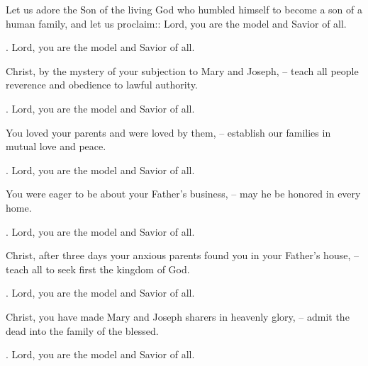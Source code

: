\lettrine[loversize=0.15,lines=2]{L}{}et us adore the Son of the living God who humbled himself to become a son of a human family, and let us proclaim::
Lord, you are the model and Savior of all.
\par \Rbar. Lord, you are the model and Savior of all.

Christ, by the mystery of your subjection to Mary and Joseph,
– teach all people reverence and obedience to lawful authority.
\par \Rbar. Lord, you are the model and Savior of all.

You loved your parents and were loved by them,
– establish our families in mutual love and peace.
\par \Rbar. Lord, you are the model and Savior of all.

You were eager to be about your Father’s business,
– may he be honored in every home.
\par \Rbar. Lord, you are the model and Savior of all.

Christ, after three days your anxious parents found you in your Father’s house,
– teach all to seek first the kingdom of God.
\par \Rbar. Lord, you are the model and Savior of all.

Christ, you have made Mary and Joseph sharers in heavenly glory,
– admit the dead into the family of the blessed.
\par \Rbar. Lord, you are the model and Savior of all.
